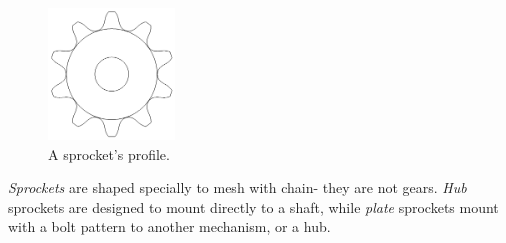 \documentclass[10pt,letterpaper]{book}
\begin{document}
\begin{figure}[H]
	\includegraphics[width=0.3\textwidth]{imgs/sprocket_profile.png}
	\caption{A sprocket's profile.}
\end{figure}

\textit{Sprockets} are shaped specially to mesh with chain- they are not gears. \textit{Hub} sprockets are designed to mount directly to a shaft, while \textit{plate} sprockets mount with a bolt pattern to another mechanism, or a hub.
\end{document}
